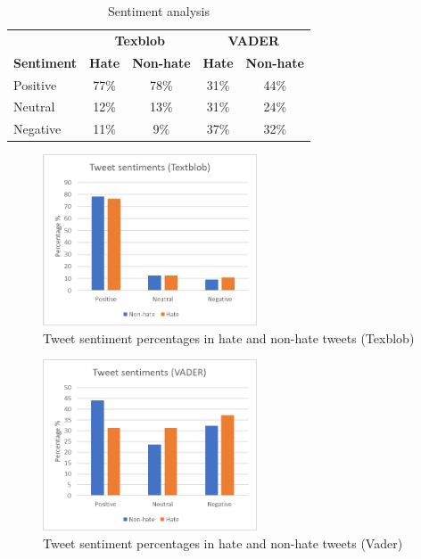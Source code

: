 \documentclass[conference]{IEEEtran}
\begin{document}
\begin{table}[!ht]
  \def\arraystretch{1.2}%
  \begin{center}
    \caption{Sentiment analysis}
    \label{tab:sentiment_anaylysis_summary}
    \begin{tabular}{l  c c | c c} 
      \hline\hline
      &\multicolumn{2}{c}{\textbf{Texblob}}&\multicolumn{2}{c}{\textbf{VADER}}\\
      \cline{2-5}
      \textbf{Sentiment}&\textbf{Hate}&\textbf{Non-hate}&\textbf{Hate}&\textbf{Non-hate}\\
      \hline
      Positive&77\%&78\%&31\%&44\%\\
      Neutral&12\%&13\%&31\%&24\%\\
      Negative&11\%&9\%&37\%&32\%\\
      \hline
      \hline      
    \end{tabular}  
  \end{center}
\end{table}

\begin{figure}[htbp]
  \centering
  \centerline{\includegraphics[width=2.5in]{Textblob.png}}
  \caption{Tweet sentiment percentages in hate and non-hate tweets (Texblob)}
  \label{fig:textblob_sentiments}
  \end{figure}

  \begin{figure}[htbp]
    \centering
    \centerline{\includegraphics[width=2.5in]{Vader.png}}
    \caption{Tweet sentiment percentages in hate and non-hate tweets (Vader)}
    \label{fig:vader_sentiments}
    \end{figure}
\end{document}

